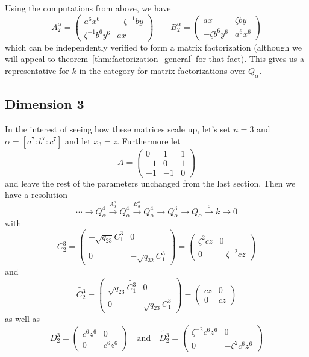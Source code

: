 \documentclass [11pt, proquest] {uwthesis}[2020/02/24]
\begin{document}
    Using the computations from above, we have
    \[A_2^\alpha=
    \begin{pmatrix}
        a^6x^6 & -\zeta^{-1}by\\ 
        \zeta^{-1} b^6y^6 & ax
    \end{pmatrix}\qquad B_2^\alpha=
    \begin{pmatrix}
        ax & \zeta by\\ 
        -\zeta b^6y^{6} & a^6 x^{6}
    \end{pmatrix}\]
    which can be independently verified to form a matrix factorization (although we will appeal to theorem~\ref{thm:factorization_general} for that fact). This gives us a representative for $k$ in the category for matrix factorizations over $Q_\alpha$.
\subsection{Dimension 3}
    In the interest of seeing how these matrices scale up, let's set $n=3$ and $\alpha=[a^7:b^7:c^7]$ and let $x_3=z$. Furthermore let
    \[A=\left(\begin{smallmatrix}
        0& 1& 1\\-1&0&1\\-1&-1&0
    \end{smallmatrix}\right)\]
    and leave the rest of the parameters unchanged from the last section. Then we have a resolution
    \[\cdots\to Q_\alpha^4\xrightarrow{A_3^\alpha}Q_\alpha^4\xrightarrow{B_3^\alpha}Q_\alpha^4\to Q_\alpha^3\to Q_\alpha\xrightarrow{\varepsilon}k\to 0\]
    with
    \[C_2^3=\begin{pmatrix}
        -\sqrt{q_{23}}C_1^3 & 0 \\ 0&-\sqrt{q_{32}}\widetilde{C_1^3}
    \end{pmatrix}=\begin{pmatrix}
        \zeta^2cz & 0\\0& -\zeta^{-2}cz
    \end{pmatrix}\]
    and
    \[\widetilde{C_2^3}=\begin{pmatrix}
        \sqrt{q_{23}}\widetilde{C_1^3} & 0 \\ 0&\sqrt{q_{23}}C_1^3
    \end{pmatrix}=\begin{pmatrix}
        cz & 0\\0&cz
    \end{pmatrix}\]
    as well as 
    \[D_2^3=\begin{pmatrix}
        c^6z^6 & 0\\0& c^6z^6
    \end{pmatrix}\quad\text{and}\quad\widetilde{D_2^3}=\begin{pmatrix}
        \zeta^{-2}c^6z^6&0\\0&-\zeta^2c^6z^6
    \end{pmatrix}\]
\end{document}
